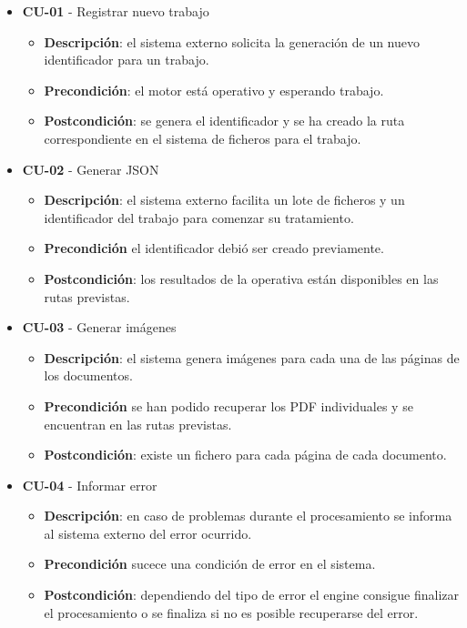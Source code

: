 \begin{itemize}
	\item \textbf{CU-01} - Registrar nuevo trabajo
	\begin{itemize}
		\item \textbf{Descripción}: el sistema externo solicita la generación de un nuevo identificador para un trabajo.
		\item \textbf{Precondición}: el motor está operativo y esperando trabajo.
		\item \textbf{Postcondición}: se genera el identificador y se ha creado la ruta correspondiente en el sistema de ficheros para el trabajo.
	\end{itemize}
\item \textbf{CU-02} - Generar JSON
	\begin{itemize}
		\item \textbf{Descripción}: el sistema externo facilita un lote de ficheros y un identificador del trabajo para comenzar su tratamiento.
		\item \textbf{Precondición} el identificador debió ser creado previamente.
		\item \textbf{Postcondición}: los resultados de la operativa están disponibles en las rutas previstas.
\end{itemize}
\item \textbf{CU-03} - Generar imágenes
	\begin{itemize}
		\item \textbf{Descripción}: el sistema genera imágenes para cada una de las páginas de los documentos.
		\item \textbf{Precondición} se han podido recuperar los PDF individuales y se encuentran en las rutas previstas.
		\item \textbf{Postcondición}: existe un fichero para cada página de cada documento.
\end{itemize}
\item \textbf{CU-04} - Informar error
	\begin{itemize}
		\item \textbf{Descripción}: en caso de problemas durante el procesamiento se informa al sistema externo del error ocurrido.
		\item \textbf{Precondición} sucece una condición de error en el sistema.
		\item \textbf{Postcondición}: dependiendo del tipo de error el engine consigue finalizar el procesamiento o se finaliza si no es posible recuperarse del error.
\end{itemize}

\end{itemize}
